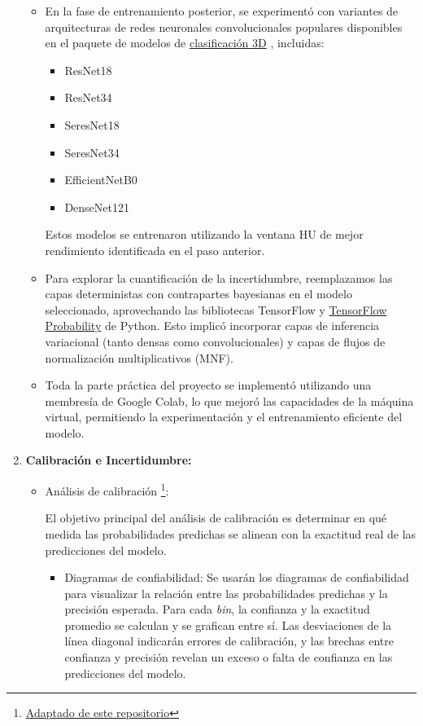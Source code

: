 \documentclass[10pt, oneside, a4paper]{article}
\begin{document}
\begin{enumerate}
\begin{itemize}
			\item En la fase de entrenamiento posterior, se experimentó con variantes de arquitecturas de redes neuronales convolucionales populares disponibles en el paquete de modelos de \href{https://github.com/ZFTurbo/classification_models_3D}{clasificación 3D} \cite{solovyev20223d}, incluidas:
			\begin{itemize}
				\item ResNet18
				\item ResNet34
				\item SeresNet18
				\item SeresNet34
				\item EfficientNetB0
				\item DenseNet121
			\end{itemize}
			
			Estos modelos se entrenaron utilizando la ventana HU de mejor rendimiento identificada en el paso anterior.
			
			\item Para explorar la cuantificación de la incertidumbre, reemplazamos las capas deterministas con contrapartes bayesianas en el modelo seleccionado, aprovechando las bibliotecas TensorFlow \cite{tensorflow2015} y \href{https://www.tensorflow.org/probability}{TensorFlow Probability} de Python. Esto implicó incorporar capas de inferencia variacional (tanto densas como convolucionales) y capas de flujos de normalización multiplicativos (MNF).
			
			\item Toda la parte práctica del proyecto se implementó utilizando una membresía de Google Colab, lo que mejoró las capacidades de la máquina virtual, permitiendo la experimentación y el entrenamiento eficiente del modelo.
		\end{itemize}
	
		\item \textbf{Calibración e Incertidumbre:}
			
		\begin{itemize}
			\item Análisis de calibración \footnote{\href{https://github.com/hollance/reliability-diagrams/blob/master/reliability_diagrams.py}{Adaptado de este repositorio}}:

			El objetivo principal del análisis de calibración es determinar en qué medida las probabilidades predichas se alinean con la exactitud real de las predicciones del modelo. 
					
			\begin{itemize}
			\item Diagramas de confiabilidad: Se usarán los diagramas de confiabilidad para visualizar la relación entre las probabilidades predichas y la precisión esperada. Para cada \textsl{bin}, la confianza y la exactitud promedio se calculan y se grafican entre sí. Las desviaciones de la línea diagonal indicarán errores de calibración, y las brechas entre confianza y precisión revelan un exceso o falta de confianza en las predicciones del modelo.
			

\end{itemize}
\end{itemize}
\end{enumerate}
\end{document}
